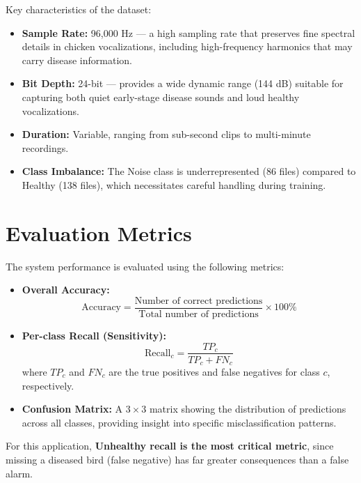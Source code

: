 \documentclass[12pt,a4paper]{report}
\begin{document}
Key characteristics of the dataset:
\begin{itemize}
    \item \textbf{Sample Rate:} 96,000 Hz --- a high sampling rate that preserves fine spectral details in chicken vocalizations, including high-frequency harmonics that may carry disease information.
    \item \textbf{Bit Depth:} 24-bit --- provides a wide dynamic range (144 dB) suitable for capturing both quiet early-stage disease sounds and loud healthy vocalizations.
    \item \textbf{Duration:} Variable, ranging from sub-second clips to multi-minute recordings.
    \item \textbf{Class Imbalance:} The Noise class is underrepresented (86 files) compared to Healthy (138 files), which necessitates careful handling during training.
\end{itemize}

\section{Evaluation Metrics}

The system performance is evaluated using the following metrics:

\begin{itemize}
    \item \textbf{Overall Accuracy:}
    \begin{equation}
        \text{Accuracy} = \frac{\text{Number of correct predictions}}{\text{Total number of predictions}} \times 100\%
    \end{equation}

    \item \textbf{Per-class Recall (Sensitivity):}
    \begin{equation}
        \text{Recall}_c = \frac{TP_c}{TP_c + FN_c}
    \end{equation}
    where $TP_c$ and $FN_c$ are the true positives and false negatives for class $c$, respectively.

    \item \textbf{Confusion Matrix:} A $3 \times 3$ matrix showing the distribution of predictions across all classes, providing insight into specific misclassification patterns.
\end{itemize}

For this application, \textbf{Unhealthy recall is the most critical metric}, since missing a diseased bird (false negative) has far greater consequences than a false alarm.
\end{document}
